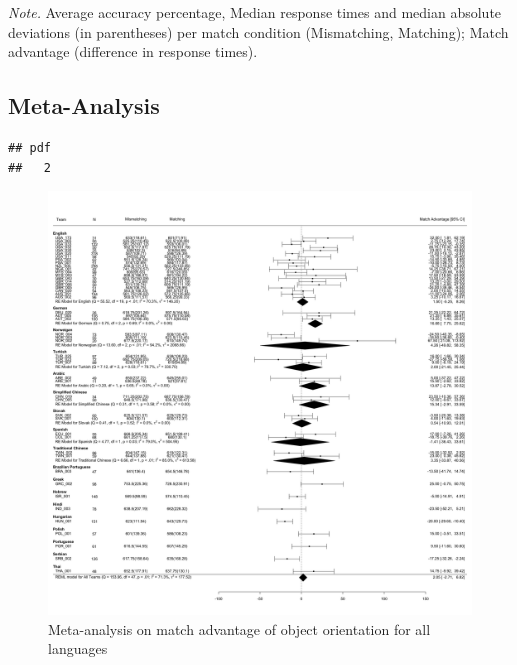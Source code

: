 \documentclass[
  man]{apa7}
\begin{document}
\begin{table}[tbp]
\begin{center}
\begin{threeparttable}
\begin{tablenotes}[para]
\normalsize{\textit{Note.} Average accuracy percentage, Median response times and median absolute deviations (in parentheses) per match condition (Mismatching, Matching); Match advantage (difference in response times).}
\end{tablenotes}

\end{threeparttable}
\end{center}

\end{table}

\hypertarget{meta-analysis}{%
\subsection{Meta-Analysis}\label{meta-analysis}}

\begin{verbatim}
## pdf 
##   2
\end{verbatim}

\begin{figure}
\centering
\includegraphics{includes/fig/meta-all.png}
\caption{\label{fig:meta-all-plot}Meta-analysis on match advantage of object orientation for all languages}
\end{figure}
\end{document}

